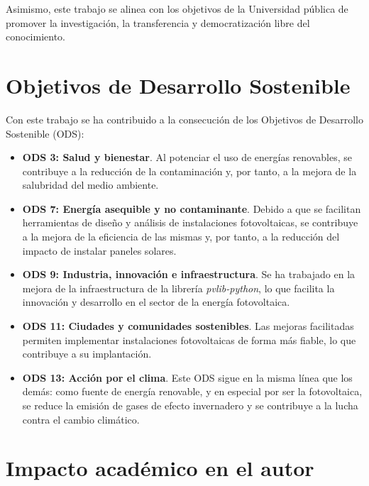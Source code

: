 Asimismo, este trabajo se alinea con los objetivos de la Universidad pública de promover la investigación, la transferencia y democratización libre del conocimiento.


\section{Objetivos de Desarrollo Sostenible} \label{sct:impacto:ods}

Con este trabajo se ha contribuido a la consecución de los Objetivos de Desarrollo Sostenible (ODS):

\begin{itemize}
  \item \textbf{ODS 3: Salud y bienestar}. Al potenciar el uso de energías renovables, se contribuye a la reducción de la contaminación y, por tanto, a la mejora de la salubridad del medio ambiente.
  \item \textbf{ODS 7: Energía asequible y no contaminante}. Debido a que se facilitan herramientas de diseño y análisis de instalaciones fotovoltaicas, se contribuye a la mejora de la eficiencia de las mismas y, por tanto, a la reducción del impacto de instalar paneles solares.
  \item \textbf{ODS 9: Industria, innovación e infraestructura}. Se ha trabajado en la mejora de la infraestructura de la librería \textit{pvlib-python}, lo que facilita la innovación y desarrollo en el sector de la energía fotovoltaica.
  \item \textbf{ODS 11: Ciudades y comunidades sostenibles}. Las mejoras facilitadas permiten implementar instalaciones fotovoltaicas de forma más fiable, lo que contribuye a su implantación.
  \item \textbf{ODS 13: Acción por el clima}. Este ODS sigue en la misma línea que los demás: como fuente de energía renovable, y en especial por ser la fotovoltaica, se reduce la emisión de gases de efecto invernadero y se contribuye a la lucha contra el cambio climático.
\end{itemize}


\section{Impacto académico en el autor} \label{sct:impacto:personal}

